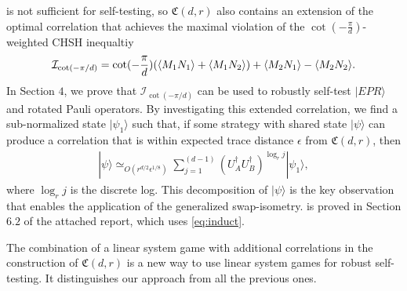 \documentclass[11pt,letterpaper]{article}
\newcommand{\ket}[1]{|#1\rangle}
\newcommand{\ct}{^{\dagger}}
\DeclarePairedDelimiter{\ip}{\langle}{\rangle}
\newcommand{\1}{\mathbb{1}}
\newcommand{\nr}{n(r)}
\newcommand{\fC}{\mathfrak{C}}
\newcommand{\I}{\mathcal{I}}
\newcommand{\ep}{\epsilon}
\newcommand{\qe}{\epsilon^{1/4}}
\newcommand{\sd}{\sqrt{d}}
\newcommand{\appd}[1]{\simeq_{#1}}
\theoremstyle{definition}
\begin{document}
 is not sufficient for self-testing, so
$\fC(d,r)$ also contains an extension of the optimal correlation 
that achieves the maximal violation of the $\cot(-\frac{\pi}{d})$-weighted CHSH inequaltiy \cite{pal2010}
\begin{align*}
    \I_{\cot(-\pi/d)} = \cot(-\frac{\pi}{d})(\ip{M_1N_1} + \ip{M_1N_2}) + \ip{M_2N_1} - \ip{M_2N_2}.
\end{align*}
In Section $4$, we prove that $\I_{\cot(-\pi/d)}$ can be used to robustly
self-test $\ket{EPR}$ and rotated Pauli operators.
By investigating this extended correlation, we find a sub-normalized state
$\ket{\psi_1}$ such that,
if some strategy with shared state $\ket{\psi}$ can produce a correlation that is within
expected trace distance $\ep$ from $\fC(d,r)$, then
\begin{align}
    \label{eq:decomp}
    \ket{\psi} \appd{O( r^{d/2} \ep^{1/8})}
    \sum_{j=1}^{(d-1)} (U_A\ct U_B\ct)^{\log_r j} \ket{\psi_1},
\end{align}
where $\log_r j $ is the discrete log.
This decomposition of $\ket{\psi}$ is the key observation that enables the application of the generalized swap-isometry.  
 is 
proved in Section $6.2$ of the attached report, which uses \cref{eq:induct}.

The combination of a linear system game with 
additional correlations in the construction of $\fC(d,r)$ 
is a new way to use linear system games for robust self-testing.
It distinguishes our approach from all the previous ones.
\end{document}
